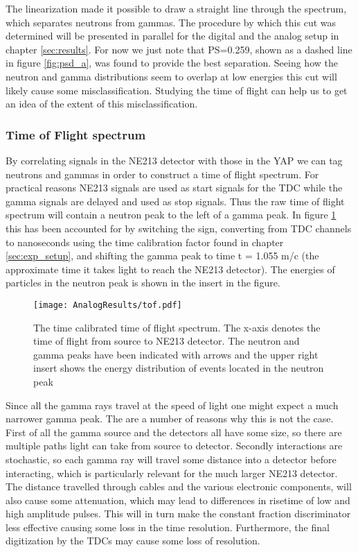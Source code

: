 \documentclass[main.tex]{subfiles}
\begin{document}
The linearization made it possible to draw a straight line through the spectrum, which separates neutrons from gammas. The procedure by which this cut was determined will be presented in parallel for the digital and the analog setup in chapter \ref{sec:results}. For now we just note that PS=0.259, shown as a dashed line in figure \ref{fig:psd_a}, was found to provide the best separation. Seeing how the neutron and gamma distributions seem to overlap at low energies this cut will likely cause some misclassification. Studying the time of flight can help us to get an idea of the extent of this misclassification.


\subsubsection{Time of Flight spectrum}
By correlating signals in the NE213 detector with those in the YAP we can tag neutrons and gammas in order to construct a time of flight spectrum. For practical reasons NE213 signals are used as start signals for the TDC while the gamma signals are delayed and used as stop signals. Thus the raw time of flight spectrum will contain a neutron peak to the left of a gamma peak. In figure \ref{fig:tof_a} this has been accounted for by switching the sign, converting from TDC channels to nanoseconds using the time calibration factor found in chapter \ref{sec:exp_setup}, and shifting the gamma peak to time t = 1.055 m/c (the approximate time it takes light to reach the NE213 detector). The energies of particles in the neutron peak is shown in the insert in the figure.

\begin{figure}[ht]
    \centering
        \texttt{[image: AnalogResults/tof.pdf]}
        \caption{The time calibrated time of flight spectrum. The x-axis denotes the time of flight from source to NE213 detector. The neutron and gamma peaks have been indicated with arrows and the upper right insert shows the energy distribution of events located in the neutron peak}
    \label{fig:tof_a}
\end{figure}

Since all the gamma rays travel at the speed of light one might expect a much narrower gamma peak. The are a number of reasons why this is not the case. First of all the gamma source and the detectors all have some size, so there are multiple paths light can take from source to detector. Secondly interactions are stochastic, so each gamma ray will travel some distance into a detector before interacting, which is particularly relevant for the much larger NE213 detector. The distance travelled through cables and the various electronic components, will also cause some attenuation, which may lead to differences in risetime of low and high amplitude pulses. This will in turn make the constant fraction discriminator less effective causing some loss in the time resolution. Furthermore, the final  digitization by the TDCs may cause some loss of resolution.
\end{document}

